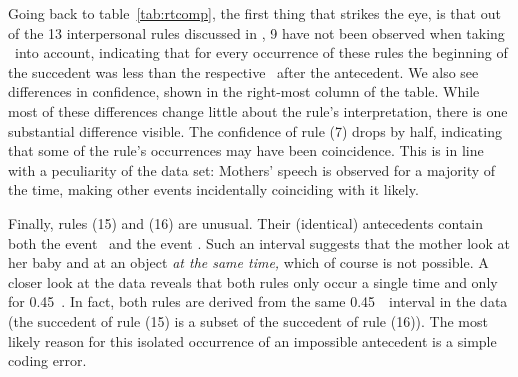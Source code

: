 Going back to table~\ref{tab:rtcomp}, the first thing that strikes the eye, is that out of the 13 interpersonal rules discussed in \citet{rohlfing_multimodal_underreview}, 9 have not been observed when taking \rt\ into account, indicating that for every occurrence of these rules the beginning of the succedent was less than the respective \rt\ after the antecedent.
We also see differences in confidence, shown in the right-most column of the table.
While most of these differences change little about the rule's interpretation, there is one substantial difference visible.
The confidence of rule (7) drops by half, indicating that some of the rule's occurrences may have been coincidence.
This is in line with a peculiarity of the data set:
Mothers' speech is observed for a majority of the time, making other events incidentally coinciding with it likely.

Finally, rules (15) and (16) are unusual.
Their (identical) antecedents contain both the event \mogain\ and the event \mogaob.
Such an interval suggests that the mother look at her baby and at an object \emph{at the same time,} which of course is not possible.
A closer look at the data reveals that both rules only occur a single time and only for 0.45~\s.
In fact, both rules are derived from the same 0.45~\s\ interval in the data (the succedent of rule (15) is a subset of the succedent of rule (16)).
The most likely reason for this isolated occurrence of an impossible antecedent is a simple coding error.
